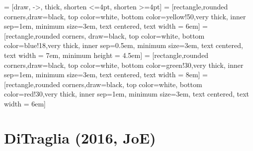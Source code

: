  = [draw, ->,  thick, shorten <=4pt, shorten >=4pt]
 = [rectangle,rounded corners,draw=black, top color=white, bottom color=yellow!50,very thick, inner sep=1em, minimum size=3em, text centered, text width = 6em]
 = [rectangle,rounded corners, draw=black, top color=white, bottom color=blue!18,very thick, inner sep=0.5em, minimum size=3em, text centered, text width = 7em, minimum height = 4.5em]
 = [rectangle,rounded corners,draw=black, top color=white, bottom color=green!30,very thick, inner sep=1em, minimum size=3em, text centered, text width = 8em]
 = [rectangle,rounded corners,draw=black, top color=white, bottom color=red!30,very thick, inner sep=1em, minimum size=3em, text centered, text width = 6em]

\section{DiTraglia (2016, JoE)}


